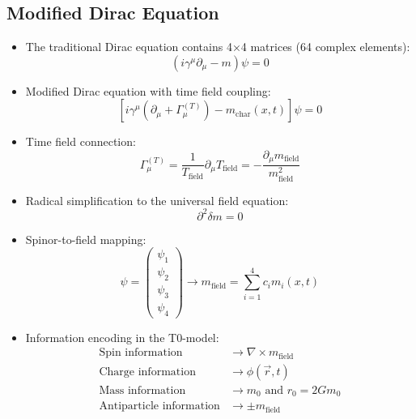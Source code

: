 \documentclass[12pt,a4paper]{article}
\begin{document}
	\subsection{Modified Dirac Equation}
	\begin{itemize}
		\item The traditional Dirac equation contains 4×4 matrices (64 complex elements):
		\begin{equation}
			\left(i\gamma^\mu \partial_\mu - m\right) \psi = 0
		\end{equation}
		
		\item Modified Dirac equation with time field coupling:
		\begin{equation}
			\boxed{\left[i\gamma^\mu\left(\partial_\mu + \Gamma_\mu^{(T)}\right) - m_{\text{char}}(x,t)\right]\psi = 0}
		\end{equation}
		
		\item Time field connection:
		\begin{equation}
			\Gamma_\mu^{(T)} = \frac{1}{T_{\text{field}}} \partial_\mu T_{\text{field}} = -\frac{\partial_\mu m_{\text{field}}}{m_{\text{field}}^2}
		\end{equation}
		
		\item Radical simplification to the universal field equation:
		\begin{equation}
			\boxed{\partial^2 \delta m = 0}
		\end{equation}
		
		\item Spinor-to-field mapping:
		\begin{equation}
			\psi = \begin{pmatrix} \psi_1 \\ \psi_2 \\ \psi_3 \\ \psi_4 \end{pmatrix} \rightarrow m_{\text{field}} = \sum_{i=1}^4 c_i m_i(x,t)
		\end{equation}
		
		\item Information encoding in the T0-model:
		\begin{align}
			\text{Spin information} &\rightarrow \nabla \times m_{\text{field}} \\
			\text{Charge information} &\rightarrow \phi(\vec{r}, t) \\
			\text{Mass information} &\rightarrow m_0 \text{ and } r_0 = 2Gm_0 \\
			\text{Antiparticle information} &\rightarrow \pm m_{\text{field}}
		\end{align}
	\end{itemize}
	
\end{document}
